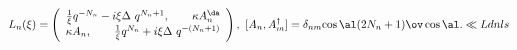 \begin{equation}
  L_{n}(\xi)  =
  \left( \begin{array}{c}
  \frac{1}{\xi}q^{-N_n}- {i \xi\Delta}~q^{N_n+1} ,
 \qquad  {\kappa}A^\da_n \\
  {\kappa}A_n    ,\qquad
  \frac{1}{\xi}q^{N_n}+ {i \xi\Delta}~q^{-(N_n+1)} 
    \end{array} \right), \ [A_n,A_m^\dagger]= \delta_{nm}{\cos \al(2N_n+1) \ov
\cos \al}.
\ll{Ldnls}\end{equation}

